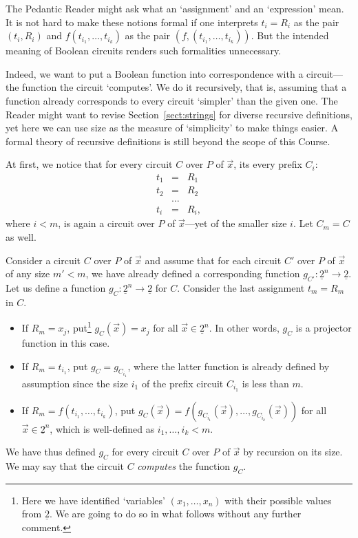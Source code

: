 \documentclass[12pt,notitlepage]{article}
\theoremstyle{plain}
\theoremstyle{definition}
\theoremstyle{plain}
\newcommand{\ul}[1]{\underline{#1}}
\newcommand{\1}{\mathbf{1}}
\newcommand{\0}{\mathbf{0}}
\begin{document}
The Pedantic Reader might ask what an `assignment' and an `expression' mean. It is not hard to make these notions formal if one interprets $t_i  = R_i$ as the pair $(t_i, R_i)$ and $f(t_{i_1},\ldots, t_{i_k})$ as the pair $(f, (t_{i_1},\ldots, t_{i_k}))$. But the intended meaning of Boolean circuits renders such formalities unnecessary.

Indeed, we want to put a Boolean function into correspondence with a circuit---the function the circuit `computes'. We do it recursively, that is, assuming that a function already corresponds to every circuit `simpler' than the given one. The Reader might want to revise Section~\ref{sect:strings} for diverse recursive definitions, yet here we can use size as the measure of `simplicity' to make things easier. A formal theory of recursive definitions is still beyond the scope of this Course.

At first, we notice that for every circuit $C$ over $P$ of $\vec x$, its every prefix $C_i$:
$$
\begin{array}{rcl}
t_1 &=& R_1\\
t_2 &=& R_2\\
&\ldots&\\
t_i &=& R_i,
\end{array}
$$
where $i < m$, is again a circuit over $P$ of $\vec x$---yet of the smaller size $i$. Let $C_m = C$ as well.

Consider a circuit $C$ over $P$ of $\vec x$ and assume that for each circuit $C'$ over $P$ of $\vec x$ of any size $m' < m$, we have already defined a corresponding function $g_{C'} \colon \ul{2}^n \to \ul{2}$. Let us define a function $g_C \colon \ul{2}^n \to \ul{2}$ for $C$. Consider the last assignment $t_m = R_m$ in $C$.
\begin{itemize}
\item If $R_m = x_j$, put\footnote{Here we have identified `variables' $(x_1, \ldots, x_n)$ with their possible values from $\ul{2}$. We are going to do so in what follows without any further comment.} $g_C(\vec x) = x_j$ for all $\vec x \in \ul{2}^n$. In other words, $g_C$ is a projector function in this case.
\item If $R_m = t_{i_1}$, put $g_C = g_{C_{i_1}}$, where the latter function is already defined by assumption since the size $i_1$ of the prefix circuit $C_{i_1}$ is less than $m$.
\item If $R_m = f(t_{i_1},\ldots, t_{i_k})$, put $g_C(\vec x) = f(g_{C_{i_1}}(\vec x),\ldots, g_{C_{i_k}}(\vec x))$ for all $\vec x \in \ul{2}^n$, which is well-defined as $i_1, \ldots, i_k < m$.
\end{itemize}
We have thus defined $g_C$ for every circuit $C$ over $P$ of $\vec x$ by recursion on its size. We may say that the circuit $C$ \emph{computes} the function $g_C$. 
\end{document}
